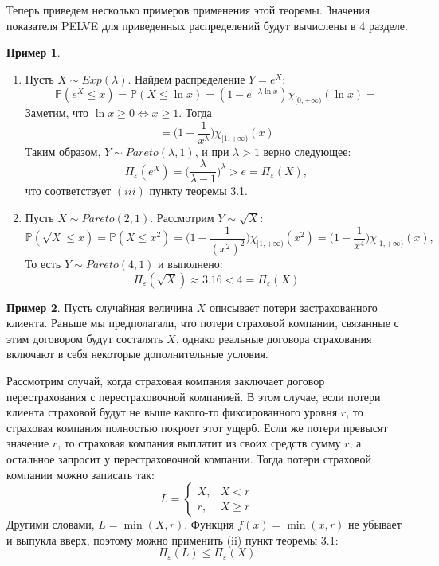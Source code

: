 \documentclass[12pt]{article}
\theoremstyle{plain}
\theoremstyle{definition}
\newtheorem{example}{Пример}[section]
\theoremstyle{remark}
\begin{document}
Теперь приведем несколько примеров применения этой теоремы. Значения показателя PELVE для приведенных распределений будут вычислены в 4 разделе.
\begin{example}
$\text{}$
    \begin{enumerate}
        \item Пусть $X \sim Exp(\lambda)$. Найдем распределение $ Y = e^X$:
        \[
            \mathbb{P}(e^X \leq x) = \mathbb{P}(X \leq \ln x) = (1 - e^{-\lambda \ln x})\chi_{[0, +\infty)}(\ln x) \boxed{=}
        \]
        Заметим, что $\ln x \geq 0 \iff x \geq 1$. Тогда 
        \[
            \boxed{=} \bigg(1-\frac{1}{x^{\lambda}}\bigg)\chi_{[1, +\infty)}(x)
        \]
        Таким образом, $Y \sim Pareto(\lambda, 1)$, и при $\lambda > 1$ верно следующее:
        \[
            \Pi_\varepsilon(e^X) = \bigg(\frac{\lambda}{\lambda - 1}\bigg)^{\lambda}  > e = \Pi_\varepsilon(X),
        \]
        что соответствует $(iii)$ пункту теоремы 3.1.
        \item Пусть $X \sim Pareto(2, 1)$. Рассмотрим $Y \sim \sqrt{X}$:
        \[
            \mathbb{P}(\sqrt{X} \leq x) = \mathbb{P}(X \leq x^2) = \bigg(1-\frac{1}{(x^2)^2}\bigg)\chi_{[1, +\infty)}(x^2) = \bigg(1-\frac{1}{x^4}\bigg)\chi_{[1, +\infty)}(x),
        \]
        То есть $Y \sim Pareto(4, 1)$ и выполнено:
        \[
            \Pi_\varepsilon(\sqrt{X}) \approx 3.16 < 4 = \Pi_\varepsilon(X)
        \]
    \end{enumerate}
\end{example}
\begin{example}
    Пусть случайная величина $X$ описывает потери застрахованного клиента. Раньше мы предполагали, что потери страховой компании, связанные с этим договором будут состалять $X$, однако реальные договора страхования включают в себя некоторые дополнительные условия. 

    Рассмотрим случай, когда страховая компания заключает договор перестрахования с перестраховочной компанией. В этом случае, если потери клиента страховой будут не выше какого-то фиксированного уровня $r$, то страховая компания полностью покроет этот ущерб. Если же потери превысят значение $r$, то страховая компания выплатит из своих средств сумму $r$, а остальное запросит у перестраховочной компании. Тогда потери страховой компании можно записать так:
    \[
        L = \begin{cases}
            X,  & X < r \\
            r, & X \geq r
        \end{cases}
    \]
    Другими словами, $L = \min(X, r)$. Функция $f(x) = \min(x, r)$ не убывает и выпукла вверх, поэтому можно применить (ii) пункт теоремы 3.1:
    \[
        \Pi_\varepsilon(L) \leq \Pi_\varepsilon(X)
    \]

    
\end{example}
\end{document}
